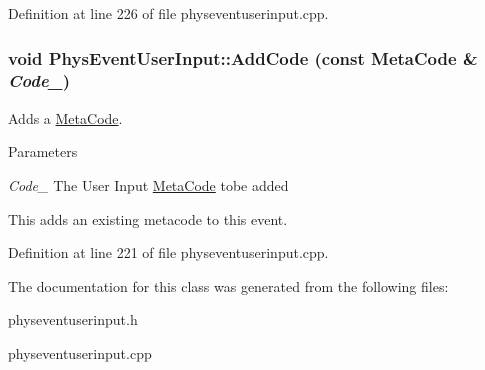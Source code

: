 Definition at line 226 of file physeventuserinput.cpp.\hypertarget{classPhysEventUserInput_a4f5b94c64cd08c15b480e441d25a385d}{
\subsubsection[{AddCode}]{\setlength{\rightskip}{0pt plus 5cm}void PhysEventUserInput::AddCode (const {\bf MetaCode} \& {\em Code\_\-})}}
\label{dc/d0e/classPhysEventUserInput_a4f5b94c64cd08c15b480e441d25a385d}


Adds a \hyperlink{classMetaCode}{MetaCode}. 
\begin{DoxyParams}{Parameters}
\item[{\em Code\_\-}]The User Input \hyperlink{classMetaCode}{MetaCode} tobe added\end{DoxyParams}
This adds an existing metacode to this event. 

Definition at line 221 of file physeventuserinput.cpp.

The documentation for this class was generated from the following files:\begin{DoxyCompactItemize}
\item 
physeventuserinput.h\item 
physeventuserinput.cpp\end{DoxyCompactItemize}
